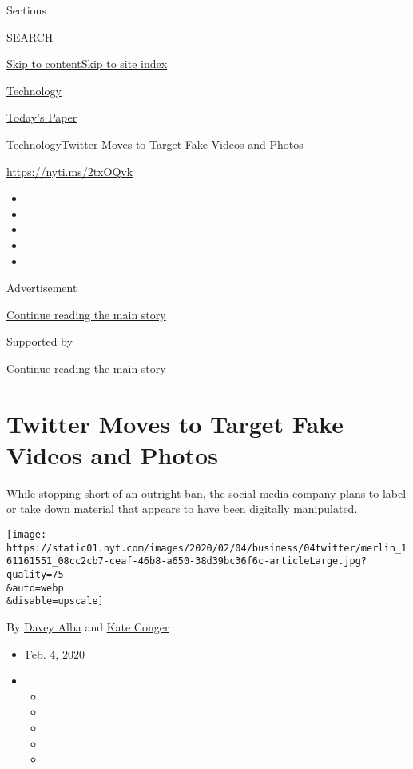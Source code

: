 Sections

SEARCH

\protect\hyperlink{site-content}{Skip to
content}\protect\hyperlink{site-index}{Skip to site index}

\href{https://www.nytimes.com/section/technology}{Technology}

\href{https://myaccount.nytimes.com/auth/login?response_type=cookie\&client_id=vi}{}

\href{https://www.nytimes.com/section/todayspaper}{Today's Paper}

\href{/section/technology}{Technology}\textbar{}Twitter Moves to Target
Fake Videos and Photos

\url{https://nyti.ms/2txOQvk}

\begin{itemize}
\item
\item
\item
\item
\item
\end{itemize}

Advertisement

\protect\hyperlink{after-top}{Continue reading the main story}

Supported by

\protect\hyperlink{after-sponsor}{Continue reading the main story}

\hypertarget{twitter-moves-to-target-fake-videos-and-photos}{%
\section{Twitter Moves to Target Fake Videos and
Photos}\label{twitter-moves-to-target-fake-videos-and-photos}}

While stopping short of an outright ban, the social media company plans
to label or take down material that appears to have been digitally
manipulated.

\texttt{[image: https://static01.nyt.com/images/2020/02/04/business/04twitter/merlin\_161161551\_08cc2cb7-ceaf-46b8-a650-38d39bc36f6c-articleLarge.jpg?quality=75\\\&auto=webp\\\&disable=upscale]}

By \href{https://www.nytimes.com/by/davey-alba}{Davey Alba} and
\href{https://www.nytimes.com/by/kate-conger}{Kate Conger}

\begin{itemize}
\item
  Feb. 4, 2020
\item
  \begin{itemize}
  \item
  \item
  \item
  \item
  \item
  \end{itemize}
\end{itemize}

